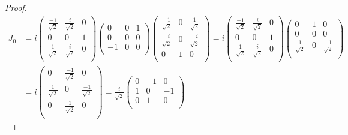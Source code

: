 \documentclass[letterpaper]{article}
\theoremstyle{definition}
\begin{document}
\begin{proof}
  \begin{align*}
    J_0 & =i\begin{pmatrix}
      \frac{-1}{\sqrt{2}} & \frac{i}{\sqrt{2}} & 0 \\
      0                   & 0                  & 1 \\
      \frac{1}{\sqrt{2}}  & \frac{i}{\sqrt{2}} & 0 \\
    \end{pmatrix}\begin{pmatrix}
      0  & 0 & 1 \\
      0  & 0 & 0 \\
      -1 & 0 & 0 \\
    \end{pmatrix}\begin{pmatrix}
      \frac{-1}{\sqrt{2}} & 0 & \frac{1}{\sqrt{2}}  \\
      \frac{-i}{\sqrt{2}} & 0 & \frac{-i}{\sqrt{2}} \\
      0                   & 1 & 0                   \\
    \end{pmatrix}=i\begin{pmatrix}
      \frac{-1}{\sqrt{2}} & \frac{i}{\sqrt{2}} & 0 \\
      0                   & 0                  & 1 \\
      \frac{1}{\sqrt{2}}  & \frac{i}{\sqrt{2}} & 0 \\
    \end{pmatrix}\begin{pmatrix}
      0                  & 1 & 0                   \\
      0                  & 0 & 0                   \\
      \frac{1}{\sqrt{2}} & 0 & \frac{-1}{\sqrt{2}} \\
    \end{pmatrix} \\
        & =i\begin{pmatrix}
      0                  & \frac{-1}{\sqrt{2}} & 0                   \\
      \frac{1}{\sqrt{2}} & 0                   & \frac{-1}{\sqrt{2}} \\
      0                  & \frac{1}{\sqrt{2}}  & 0                   \\
    \end{pmatrix}=\frac{i}{\sqrt{2}}\begin{pmatrix}
      0 & -1 & 0  \\
      1 & 0  & -1 \\
      0 & 1  & 0  \\
    \end{pmatrix}
  \end{align*}


\end{proof}
\end{document}
